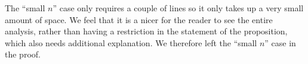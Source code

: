 \begin{comment}
	Proposition 5.2: And now: Why do you write up the proof using the most complicated type of TMs
	possible? For your construction it would be perfectly sufficient to have a
	single tape machine. Your computations take at most two IDs of size $O(log(n))$
	as input and produce one such ID as output. This even fits on a single tape if
	you restrict to length $n$. You are assuming $n > n_0$ for some sufficiently large $n_0$
	anyway. Using only a single tape makes the construction much more readable, as you can
	get rid of many indices.
\end{comment}

\answer \TODO

\bigskip

\begin{comment}
	Proposition 5.2: If you change Algorithm 1 as laid out above, it could make sense to
	actually allow for an output ``tape'' that is formed like a square matrix. The
	head of the output tape could move in four directions (simulated by two
	vectors wit a single 1 entry). It is obvious (to all that know TMs) that this
	does not add additional power and one can easily translate the TM producing
	the circuit to such a TM with a square output. The advantage would be that
	you could directly produce the adjacency matrix of the circuit which you
	could use immediately in the expression that evaluates your circuit.
\end{comment}

\answer \TODO

\bigskip

\begin{comment}
	Proposition 5.2: Also, you do not need to consider the case of small $n$ at all. This case is already considered in the proof of Theorem 1. You can restrict Proposition 5.2 to all
	$n$ greater than some $n_0$ (and maybe say that it also holds without this
	restriction). But no need to waste the space for the proof.
\end{comment}

\answer The ``small $n$'' case only requires a couple of lines so it only takes up a very small amount of space. We feel that it is a nicer for the reader to see the entire analysis, rather than having a restriction in the statement of the proposition, which also needs additional explanation. We therefore left the ``small $n$'' case in the proof.

\bigskip

